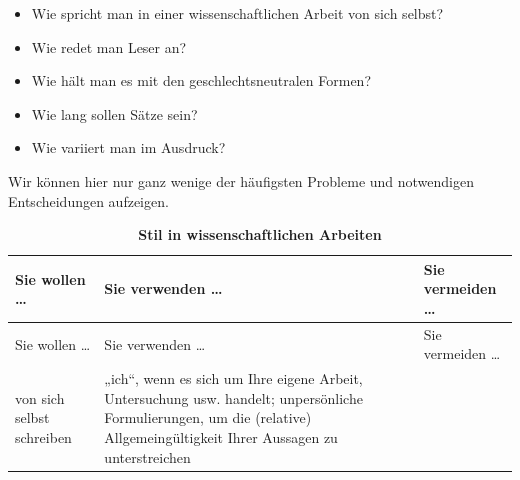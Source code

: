 \documentclass[]{book}
\providecommand{\tightlist}{%
  \setlength{\itemsep}{0pt}\setlength{\parskip}{0pt}}
\theoremstyle{definition}
\theoremstyle{definition}
\theoremstyle{definition}
\theoremstyle{remark}
\begin{document}
\begin{itemize}
\tightlist
\item
  Wie spricht man in einer wissenschaftlichen Arbeit von sich selbst?
\item
  Wie redet man Leser an?
\item
  Wie hält man es mit den geschlechtsneutralen Formen?
\item
  Wie lang sollen Sätze sein?
\item
  Wie variiert man im Ausdruck?
\end{itemize}

Wir können hier nur ganz wenige der häufigsten Probleme und notwendigen
Entscheidungen aufzeigen.

\begin{longtable}[]{@{}lll@{}}
\caption{\textbf{\label{tab:stil} Stil in wissenschaftlichen
Arbeiten}}\tabularnewline
\toprule
\begin{minipage}[b]{0.11\columnwidth}\raggedright\strut
Sie wollen \ldots{}\strut
\end{minipage} & \begin{minipage}[b]{0.42\columnwidth}\raggedright\strut
Sie verwenden \ldots{}\strut
\end{minipage} & \begin{minipage}[b]{0.39\columnwidth}\raggedright\strut
Sie vermeiden \ldots{}\strut
\end{minipage}\tabularnewline
\midrule
\endfirsthead
\toprule
\begin{minipage}[b]{0.11\columnwidth}\raggedright\strut
Sie wollen \ldots{}\strut
\end{minipage} & \begin{minipage}[b]{0.42\columnwidth}\raggedright\strut
Sie verwenden \ldots{}\strut
\end{minipage} & \begin{minipage}[b]{0.39\columnwidth}\raggedright\strut
Sie vermeiden \ldots{}\strut
\end{minipage}\tabularnewline
\midrule
\endhead
\begin{minipage}[t]{0.11\columnwidth}\raggedright\strut
von sich selbst schreiben\strut
\end{minipage} & \begin{minipage}[t]{0.42\columnwidth}\raggedright\strut
„ich``, wenn es sich um Ihre eigene Arbeit, Untersuchung usw. handelt;
unpersönliche Formulierungen, um die (relative) Allgemeingültigkeit
Ihrer Aussagen zu unterstreichen \vspace{-6mm}\strut
\end{minipage} & \begin{minipage}[t]{0.39\columnwidth}\raggedright\strut

\end{minipage}
\end{longtable}
\end{document}
